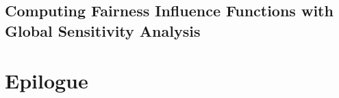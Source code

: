 \documentclass[12pt]{report}
\makeatletter
\newcommand\backmatter{%
	\if@openright
	\cleardoublepage
	\else
	\clearpage
	\fi
}
\makeatother
\begin{document}
			\chapter{Computing Fairness Influence Functions with Global Sensitivity Analysis}				
%				
				
%				
				
				
				
					
			
		\part{Epilogue}
	\backmatter
	
	
%	
	
		
	
\end{document}
